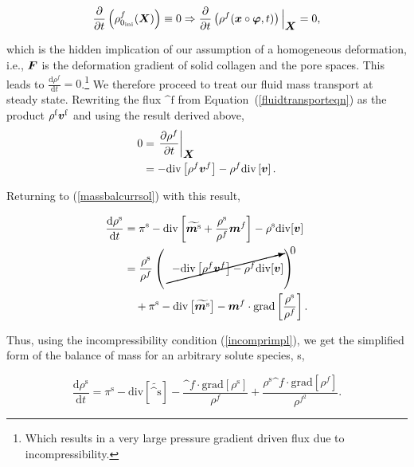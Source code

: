 \begin{equation}
\frac{\partial} {\partial t}\left(
\rho_{0_{\mathrm{ini}}}^{f}(\mbox{\boldmath$ X$}) \right) \equiv 0 \Rightarrow
\frac{\partial} {\partial t}\left(\rho^{f} (\mbox{\boldmath$ x$}\circ\mbox{\boldmath$\varphi$},t)
\right)\Big\vert_{\mbox{\boldmath$ X$}} = 0,
\end{equation}

\noindent which is the hidden implication of our assumption of a
homogeneous deformation, i.e., $\mbox{\boldmath$ F$}$ is the deformation gradient of
solid collagen and the pore spaces.  This leads to $\frac{\mathrm{d}
  \rho^f} {\mathrm{d} 
  t}=0$.\footnote{Which results in a very large pressure gradient
  driven flux due to incompressibility. } We
therefore proceed to treat our fluid mass transport at steady
state. Rewriting the flux $\bm^{\mathrm{f}}$ from \mbox{Equation
(\ref{fluidtransporteqn})} as the product $\rho^{\mathrm{f}}
\mbox{\boldmath$ v$}^{\mathrm{f}}$ and using the result derived above,
\begin{equation}
\begin{split}
0 &= \left. \frac{\partial \rho^f}{\partial t} \right|_{\mbox{\boldmath$ X$}}\\ &=
-\mathrm{div}\left[\rho^f \mbox{\boldmath$ v$}^{f}\right] - \rho^f
\mathrm{div}\left[\mbox{\boldmath$ v$}\right].
\end{split}
\label{incomprimpl}
\end{equation}

\noindent Returning to (\ref{massbalcurrsol}) with this result,

\begin{equation}
\begin{split}
\frac{\mathrm{d}\rho^\mathrm{s}}{\mathrm{d}t} &= \pi^\mathrm{s}-
\mathrm{div} \left[\widetilde{\bm^\mathrm{s}}+
\frac{\rho^\mathrm{s}}{\rho^f}\bm^f\right] - \rho^\mathrm{s}
\mathrm{div}[\bv]\\ &= \frac{\rho^\mathrm{s}}{\rho^f}\left(\cancelto{0}
{-\mathrm{div}\left[\rho^f \bv^{f}\right] - \rho^f
\mathrm{div}[\bv]}\right)\\ &\quad{} + \pi^\mathrm{s} -
\mathrm{div}\left[\widetilde{\bm^\mathrm{s}}\right]
-\bm^f\cdot\mathrm{grad}\left[\frac{ \rho^\mathrm{s}}{\rho^f}\right].\\
\end{split}
\end{equation}

Thus, using the incompressibility condition (\ref{incomprimpl}), we
get the simplified form of the balance of mass for an arbitrary solute
species, s,

\begin{equation}
\frac{\mathrm{d}\rho^\mathrm{s}}{\mathrm{d}t}=\pi^\mathrm{s} -
\mathrm{div}\left[\widetilde{\bm^\mathrm{s}}\right] -
\frac{\bm^f\cdot\mathrm{grad}\left[\rho^\mathrm{s}\right]}{\rho^f} +
\frac{\rho^\mathrm{s} \bm^f \cdot \mathrm{grad}\left[\rho^f\right]}
{\rho^{f^2}}.
\label{stdform}
\end{equation}


